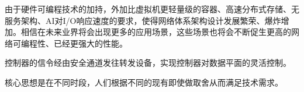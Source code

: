由于硬件可编程技术的加持，外加比虚拟机更轻量级的容器、高速分布式存储、无服务架构、AI对I/O响应速度的要求，使得网络体系架构设计发展繁荣、爆炸增加。相信在未来业界将会出现更多的应用场景，这些场景也将会不断促生更高的网络可编程性、已经更强大的性能。























控制器的信令经由安全通道发往转发设备，实现控制器对数据平面的灵活控制。







核心思想是在不同时段，人们根据不同的现有即使做取舍从而满足技术需求。











































